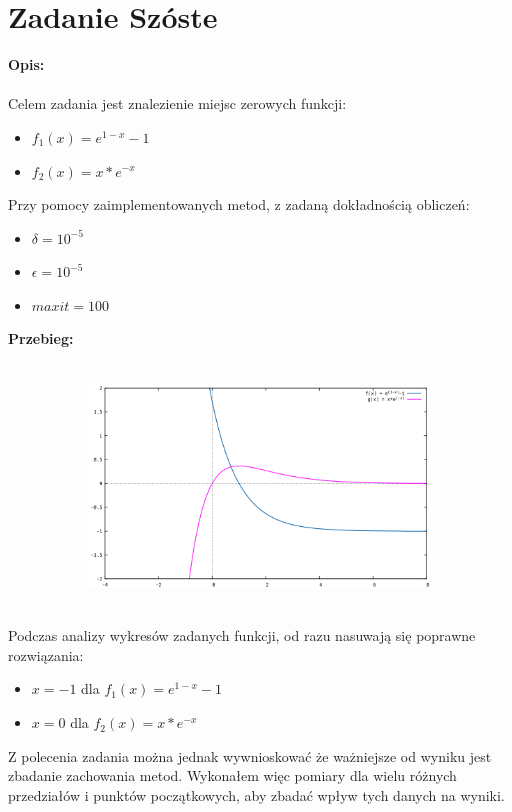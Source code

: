 \documentclass{article}
\begin{document}
\section*{Zadanie Szóste}
\noindent \textbf{Opis: }\\\\
Celem zadania jest znalezienie miejsc zerowych funkcji:
\begin{itemize}
	\item $f_{1}(x) = e^{1-x}-1$
	\item $f_{2}(x) = x*e^{-x}$ 	
\end{itemize}
Przy pomocy zaimplementowanych metod, z zadaną dokładnością obliczeń:
\begin{itemize}
	\item $\delta = 10^{-5}$
	\item $\epsilon = 10^{-5}$
	\item $maxit = 100$
\end{itemize}
\noindent \textbf{Przebieg: }\\\\
\begin{figure}[ht]
	\begin{subfigure}{.5\textwidth}
		\includegraphics[width=2.0\linewidth]{plots/wykres_3.png}  
	\end{subfigure}
\end{figure} \\
Podczas analizy wykresów zadanych funkcji, od razu nasuwają się poprawne rozwiązania:
\begin{itemize}
	\item $x=-1$ dla $f_{1}(x) = e^{1-x}-1$
	\item $x=0$ dla $f_{2}(x) = x*e^{-x}$ 
\end{itemize}
Z polecenia zadania można jednak wywnioskować że ważniejsze od wyniku jest zbadanie zachowania metod. Wykonałem więc pomiary dla wielu różnych przedziałów i punktów początkowych, aby zbadać wpływ tych danych na wyniki.\\\\
\end{document}
